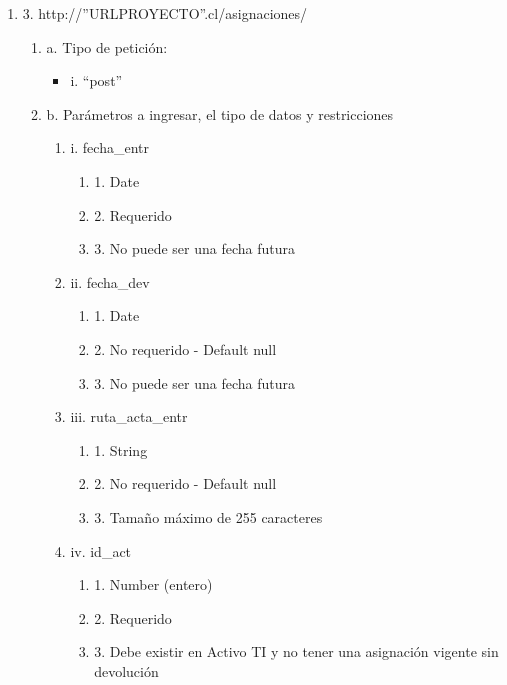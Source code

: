 \begin{enumerate}
    \item 3. http://”URLPROYECTO”.cl/asignaciones/
    \begin{enumerate}
        \item a. Tipo de petición:
            \begin{itemize}
               \item i. “post”
            \end{itemize}
        \item b. Parámetros a ingresar, el tipo de datos y restricciones
            \begin{enumerate}
                \item i. fecha\_entr
                    \begin{enumerate}
                        \item 1. Date
                        \item 2. Requerido
                        \item 3. No puede ser una fecha futura
                    \end{enumerate}
                \item ii. fecha\_dev
                    \begin{enumerate}
                        \item 1. Date
                        \item 2. No requerido - Default null
                        \item 3. No puede ser una fecha futura
                    \end{enumerate}
                \item iii. ruta\_acta\_entr
                    \begin{enumerate}
                        \item 1. String
                        \item 2. No requerido - Default null
                        \item 3. Tamaño máximo de 255 caracteres
                    \end{enumerate}
                \item iv. id\_act
                    \begin{enumerate}
                        \item 1. Number (entero)
                        \item 2. Requerido
                        \item 3. Debe existir en Activo TI y no tener una asignación vigente sin devolución

\end{enumerate}
\end{enumerate}
\end{enumerate}
\end{enumerate}
